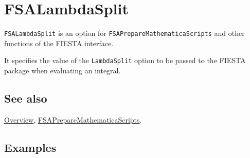 \documentclass[../FeynHelpersManual.tex]{subfiles}
\begin{document}
\hypertarget{fsalambdasplit}{
\section{FSALambdaSplit}\label{fsalambdasplit}}

\texttt{FSALambdaSplit} is an option for
\texttt{FSAPrepareMathematicaScripts} and other functions of the FIESTA
interface.

It specifies the value of the \texttt{LambdaSplit} option to be passed
to the FIESTA package when evaluating an integral.

\subsection{See also}

\hyperlink{toc}{Overview},
\hyperlink{fsapreparemathematicascripts}{FSAPrepareMathematicaScripts}.

\subsection{Examples}
\end{document}
